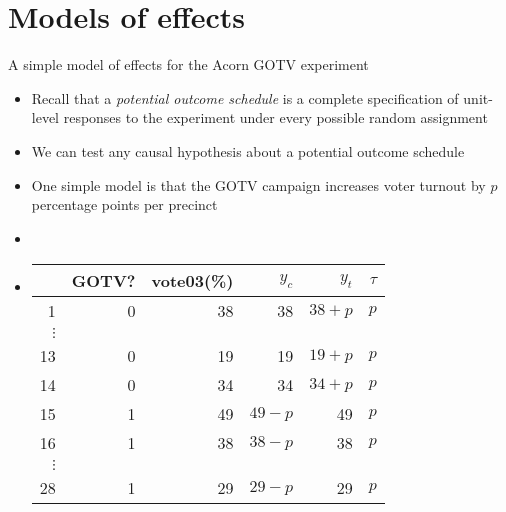 \documentclass[table, xcolor={dvipsnames}, 9pt]{beamer}
\theoremstyle{newstyle}
\begin{document}
\section{Models of effects}
\begin{frame}{A simple model of effects for the Acorn GOTV experiment}
\begin{itemize}
\item Recall that a \textit{potential outcome schedule} is a complete specification of unit-level responses to the experiment under every possible random assignment \pause 
\item We can test any causal hypothesis about a potential outcome schedule \pause 
\item One simple model is that the GOTV campaign increases voter turnout by $p$ percentage points per precinct \pause 
\item[]
\item[]
\begin{center}
  \begin{tabular}{r|rr|rrr}
  \hline
 & GOTV? & vote03(\%)& $y_c$ & $y_t$ & $\tau$\\
  \hline
1 & 0 & 38 & 38 & $38 + p$ & $p$ \\
$\vdots$& & & & & \\
13 & 0 & 19 & 19 & $19 + p$ & $p$ \\
14 & 0 & 34 & 34 & $34 + p$ & $p$ \\
15 & 1 & 49 & $49 - p$ & 49 & $p$ \\
16 & 1 & 38 & $38 - p$ & 38 & $p$ \\
$\vdots$& & & & & \\
28 & 1 & 29 & $29 - p$ & 29 & $p$ \\
   \hline
\end{tabular}
\end{center}
\end{itemize}
\end{frame}
\end{document}
